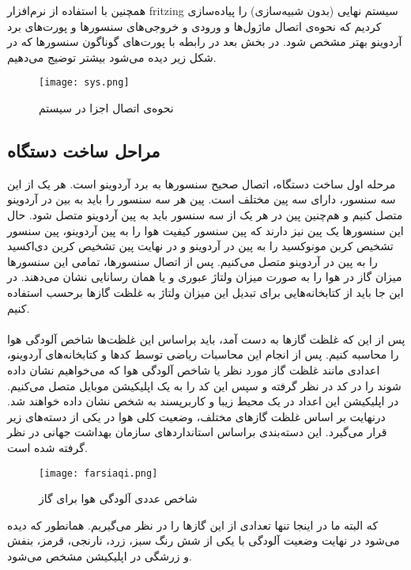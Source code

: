 همچنین با استفاده از نرم‌افزار 
fritzing
سیستم نهایی (بدون شبیه‌سازی) را پیاده‌سازی کردیم که نحوه‌ی اتصال ماژول‌ها و ورودی و خروجی‌های سنسور‌ها و پورت‌های برد آردوینو بهتر مشخص شود.  در بخش بعد در رابطه با پورت‌های گوناگون سنسور‌ها که در شکل زیر دیده می‌شود بیشتر توضیج می‌دهیم. 

\begin{figure}[h!]
	\centering		
	\texttt{[image: sys.png]}
	\caption{نحوه‌ی اتصال اجزا در سیستم}
	\label{fig:boat1}
\end{figure}


\subsection{مراحل ساخت دستگاه}

مرحله اول ساخت دستگاه، اتصال صحیح سنسور‌ها به برد آردوینو است. هر یک از این سه سنسور، دارای سه پین مختلف است. پین 
هر سه سنسور را باید به بین 
در آردوینو متصل کنیم و هم‌چنین پین 
در هر یک از سه سنسور باید به پین 
آردوینو متصل شود. حال این سنسور‌ها یک پین 
نیز دارند که پین 
سنسور کیفیت هوا را به پین 
آردوینو، پین 
سنسور تشخیص کربن مونوکسید را به پین
در آردوینو و در نهایت پین تشخیص کربن دی‌اکسید را به پین 
در آردوینو متصل می‌کنیم. پس از اتصال سنسور‌ها، تمامی این سنسور‌ها میزان گاز در هوا را به صورت میزان ولتاژ عبوری و یا همان رسانایی نشان می‌دهند. در این جا باید از کتابخانه‌هایی برای تبدیل این میزان ولتاژ به غلظت گازها برحسب 
استفاده کنیم. 
\paragraph{}
پس از این که غلظت گازها به دست آمد، باید براساس این غلظت‌ها شاخص آلودگی هوا را محاسبه کنیم. پس از انجام این محاسبات ریاضی توسط کد‌ها و کتابخانه‌های آردوینو، اعدادی مانند غلظت گاز مورد نظر یا شاخص آلودگی هوا که می‌خواهیم نشان داده شوند را در کد در نظر گرفته و سپس این کد را به یک اپلیکیشن موبایل متصل می‌کنیم. در اپلیکیشن این اعداد در یک محیط زیبا و کاربرپسند به شخص نشان داده خواهند شد. درنهایت بر اساس غلظت گاز‌های مختلف، وضعیت کلی هوا در یکی از دسته‌های زیر قرار می‌گیرد. این دسته‌بندی بر‌اساس استاندارد‌های سازمان بهداشت جهانی در نظر گرفته شده است. 
\begin{figure}[h!]
	\centering	
	\texttt{[image: farsiaqi.png]}
	\caption{شاخص عددی آلودگی هوا برای گاز}
	\label{fig:boat1}
\end{figure} 

که البته ما در اینجا تنها تعدادی از این گاز‌ها را در نظر می‌گیریم. همانطور که دیده می‌شود در نهایت وضعیت آلودگی با یکی از شش رنگ سبز، زرد، نارنجی، قرمز، بنفش و زرشگی در اپلیکیشن مشخص می‌شود.  
